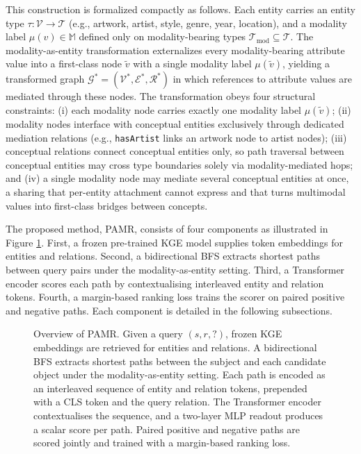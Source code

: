 \documentclass[runningheads]{llncs}
\begin{document}
This construction is formalized compactly as follows. Each entity carries an entity type $\tau: \mathcal{V} \to \mathcal{T}$ (e.g., artwork, artist, style, genre, year, location), and a modality label $\mu(v) \in \mathbb{M}$ defined only on modality-bearing types $\mathcal{T}_{\text{mod}} \subseteq \mathcal{T}$. The modality-as-entity transformation externalizes every modality-bearing attribute value into a first-class node $\tilde{v}$ with a single modality label $\mu(\tilde{v})$, yielding a transformed graph $\mathcal{G}^{*} = (\mathcal{V}^{*}, \mathcal{E}^{*}, \mathcal{R}^{*})$ in which references to attribute values are mediated through these nodes. The transformation obeys four structural constraints: (i) each modality node carries exactly one modality label $\mu(\tilde{v})$; (ii) modality nodes interface with conceptual entities exclusively through dedicated mediation relations (e.g., \texttt{hasArtist} links an artwork node to artist nodes); (iii) conceptual relations connect conceptual entities only, so path traversal between conceptual entities may cross type boundaries solely via modality-mediated hops; and (iv) a single modality node may mediate several conceptual entities at once, a sharing that per-entity attachment cannot express and that turns multimodal values into first-class bridges between concepts.

The proposed method, PAMR, consists of four components as illustrated in Figure \ref{fig:overview}. First, a frozen
pre-trained KGE model supplies token embeddings for entities and relations.
Second, a bidirectional BFS extracts shortest paths between query pairs under the modality-as-entity setting.
Third, a Transformer encoder scores each path by contextualising
interleaved entity and relation tokens. Fourth, a margin-based ranking
loss trains the scorer on paired positive and negative paths. Each
component is detailed in the following subsections.

\begin{figure}[t]
  \centering
  
  \caption{Overview of PAMR. Given a query $(s, r, ?)$, frozen KGE embeddings are retrieved for entities and relations. A bidirectional BFS extracts shortest paths between the subject and each candidate object under the modality-as-entity setting. Each path is encoded as an interleaved sequence of entity and relation tokens, prepended with a CLS token and the query relation. The Transformer encoder contextualises the sequence, and a two-layer MLP readout produces a scalar score per path. Paired positive and negative paths are scored jointly and trained with a margin-based ranking loss.}
  \label{fig:overview}
\end{figure}
\end{document}

